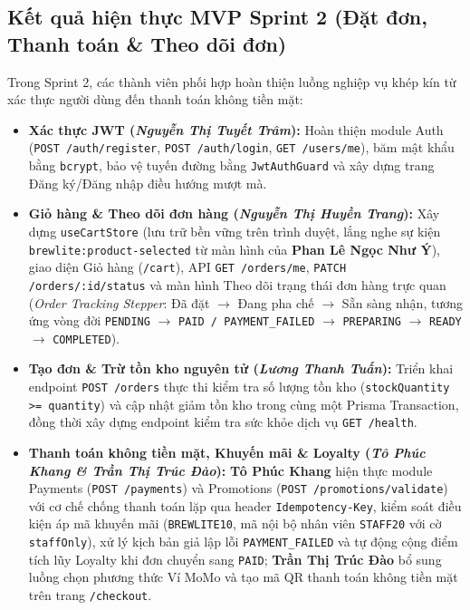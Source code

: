 \subsection{Kết quả hiện thực MVP Sprint 2 (Đặt đơn, Thanh toán \& Theo dõi đơn)}
Trong Sprint 2, các thành viên phối hợp hoàn thiện luồng nghiệp vụ khép kín từ xác thực người dùng đến thanh toán không tiền mặt:
\begin{itemize}
    \item \textbf{Xác thực JWT (\textit{Nguyễn Thị Tuyết Trâm}):} Hoàn thiện module Auth (\texttt{POST /auth/register}, \texttt{POST /auth/login}, \texttt{GET /users/me}), băm mật khẩu bằng \texttt{bcrypt}, bảo vệ tuyến đường bằng \texttt{JwtAuthGuard} và xây dựng trang Đăng ký/Đăng nhập điều hướng mượt mà.
    \item \textbf{Giỏ hàng \& Theo dõi đơn hàng (\textit{Nguyễn Thị Huyền Trang}):} Xây dựng \texttt{useCartStore} (lưu trữ bền vững trên trình duyệt, lắng nghe sự kiện \texttt{brewlite:product-selected} từ màn hình của \textbf{Phan Lê Ngọc Như Ý}), giao diện Giỏ hàng (\texttt{/cart}), API \texttt{GET /orders/me}, \texttt{PATCH /orders/:id/status} và màn hình Theo dõi trạng thái đơn hàng trực quan (\textit{Order Tracking Stepper}: Đã đặt $\rightarrow$ Đang pha chế $\rightarrow$ Sẵn sàng nhận, tương ứng vòng đời \texttt{PENDING} $\rightarrow$ \texttt{PAID / PAYMENT\_FAILED} $\rightarrow$ \texttt{PREPARING} $\rightarrow$ \texttt{READY} $\rightarrow$ \texttt{COMPLETED}).
    \item \textbf{Tạo đơn \& Trừ tồn kho nguyên tử (\textit{Lương Thanh Tuấn}):} Triển khai endpoint \texttt{POST /orders} thực thi kiểm tra số lượng tồn kho (\texttt{stockQuantity >= quantity}) và cập nhật giảm tồn kho trong cùng một Prisma Transaction, đồng thời xây dựng endpoint kiểm tra sức khỏe dịch vụ \texttt{GET /health}.
    \item \textbf{Thanh toán không tiền mặt, Khuyến mãi \& Loyalty (\textit{Tô Phúc Khang \& Trần Thị Trúc Đào}):} \textbf{Tô Phúc Khang} hiện thực module Payments (\texttt{POST /payments}) và Promotions (\texttt{POST /promotions/validate}) với cơ chế chống thanh toán lặp qua header \texttt{Idempotency-Key}, kiểm soát điều kiện áp mã khuyến mãi (\texttt{BREWLITE10}, mã nội bộ nhân viên \texttt{STAFF20} với cờ \texttt{staffOnly}), xử lý kịch bản giả lập lỗi \texttt{PAYMENT\_FAILED} và tự động cộng điểm tích lũy Loyalty khi đơn chuyển sang \texttt{PAID}; \textbf{Trần Thị Trúc Đào} bổ sung luồng chọn phương thức Ví MoMo và tạo mã QR thanh toán không tiền mặt trên trang \texttt{/checkout}.
\end{itemize}

